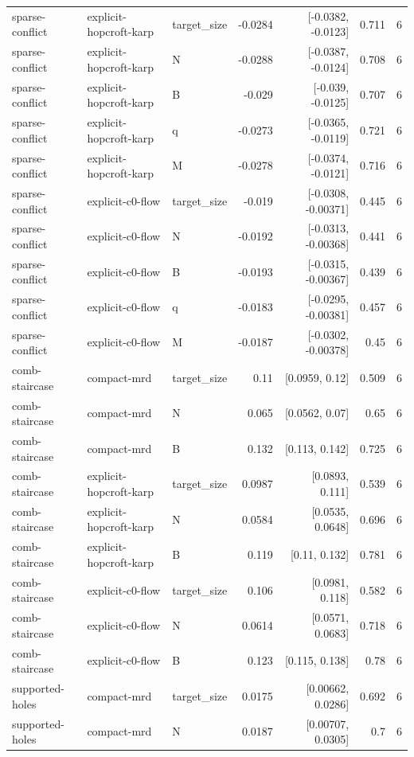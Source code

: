 \begin{table}[t]
\begin{tabular}{lllrrrr}
sparse-conflict & explicit-hopcroft-karp & target_size & -0.0284 & [-0.0382, -0.0123] & 0.711 & 6 \\
sparse-conflict & explicit-hopcroft-karp & N & -0.0288 & [-0.0387, -0.0124] & 0.708 & 6 \\
sparse-conflict & explicit-hopcroft-karp & B & -0.029 & [-0.039, -0.0125] & 0.707 & 6 \\
sparse-conflict & explicit-hopcroft-karp & q & -0.0273 & [-0.0365, -0.0119] & 0.721 & 6 \\
sparse-conflict & explicit-hopcroft-karp & M & -0.0278 & [-0.0374, -0.0121] & 0.716 & 6 \\
sparse-conflict & explicit-c0-flow & target_size & -0.019 & [-0.0308, -0.00371] & 0.445 & 6 \\
sparse-conflict & explicit-c0-flow & N & -0.0192 & [-0.0313, -0.00368] & 0.441 & 6 \\
sparse-conflict & explicit-c0-flow & B & -0.0193 & [-0.0315, -0.00367] & 0.439 & 6 \\
sparse-conflict & explicit-c0-flow & q & -0.0183 & [-0.0295, -0.00381] & 0.457 & 6 \\
sparse-conflict & explicit-c0-flow & M & -0.0187 & [-0.0302, -0.00378] & 0.45 & 6 \\
comb-staircase & compact-mrd & target_size & 0.11 & [0.0959, 0.12] & 0.509 & 6 \\
comb-staircase & compact-mrd & N & 0.065 & [0.0562, 0.07] & 0.65 & 6 \\
comb-staircase & compact-mrd & B & 0.132 & [0.113, 0.142] & 0.725 & 6 \\
comb-staircase & explicit-hopcroft-karp & target_size & 0.0987 & [0.0893, 0.111] & 0.539 & 6 \\
comb-staircase & explicit-hopcroft-karp & N & 0.0584 & [0.0535, 0.0648] & 0.696 & 6 \\
comb-staircase & explicit-hopcroft-karp & B & 0.119 & [0.11, 0.132] & 0.781 & 6 \\
comb-staircase & explicit-c0-flow & target_size & 0.106 & [0.0981, 0.118] & 0.582 & 6 \\
comb-staircase & explicit-c0-flow & N & 0.0614 & [0.0571, 0.0683] & 0.718 & 6 \\
comb-staircase & explicit-c0-flow & B & 0.123 & [0.115, 0.138] & 0.78 & 6 \\
supported-holes & compact-mrd & target_size & 0.0175 & [0.00662, 0.0286] & 0.692 & 6 \\
supported-holes & compact-mrd & N & 0.0187 & [0.00707, 0.0305] & 0.7 & 6 \\

\end{tabular}
\end{table}
